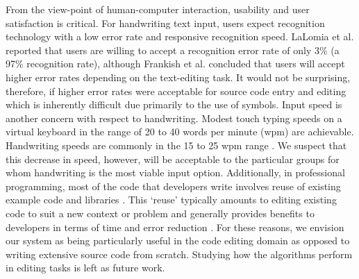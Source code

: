 \documentclass{vgtc}                          %
\begin{document}


  




From the view-point of human-computer interaction, usability and user satisfaction is critical. For handwriting text input, users expect recognition technology with a low error rate and responsive recognition speed. LaLomia et al. \cite{lalomia1994user} reported that users are willing to accept a recognition error rate of only 3\% (a 97\% recognition rate), although Frankish et al. \cite{frankish1995recognition} concluded that users will accept higher error rates depending on the text-editing task. It would not be surprising, therefore, if higher error rates were acceptable for source code entry and editing which is inherently difficult due primarily to the use of symbols. Input speed is another concern with respect to handwriting. Modest touch typing speeds on a virtual keyboard in the range of 20 to 40 words per minute (wpm) are achievable.
Handwriting speeds are commonly in the 15 to 25 wpm range \cite{card1983psychology,devoe1967alternatives,dunlop2009pickup}. We suspect that this decrease in speed, however, will be acceptable to the particular groups for whom handwriting is the most viable input option. Additionally, in professional programming, most of the code that developers
write involves reuse of existing example code and libraries \cite{bellon2007comparison}. This `reuse' typically amounts to editing existing code to suit a
new context or problem and generally provides benefits to developers in terms of time and error reduction \cite{ko2011state}.
For these reasons, we envision our system as being particularly useful in the code editing domain as opposed to writing extensive source code from scratch.  Studying how the algorithms perform in editing tasks is left as future work.
\end{document}
